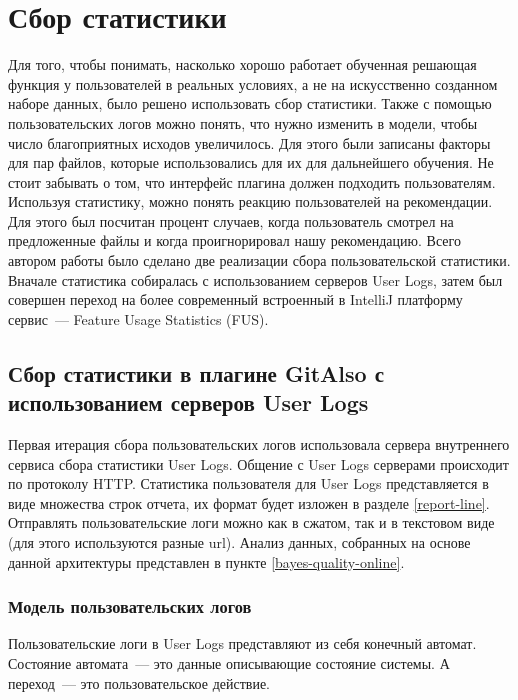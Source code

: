 \section{Сбор статистики}\label{stats-main}
Для того, чтобы понимать, насколько хорошо работает обученная решающая функция у пользователей в реальных условиях, а не на искусственно созданном наборе данных, было решено использовать сбор статистики. Также с помощью пользовательских логов можно понять, что нужно изменить в модели, чтобы число благоприятных исходов увеличилось. Для этого были записаны факторы для пар файлов, которые использовались для их для дальнейшего обучения. Не стоит забывать о том, что интерфейс плагина должен подходить пользователям. Используя статистику, можно понять реакцию пользователей на рекомендации. Для этого был посчитан процент случаев, когда пользователь смотрел на предложенные файлы и когда проигнорировал нашу рекомендацию. Всего автором работы было сделано две реализации сбора пользовательской статистики. Вначале статистика собиралась с использованием серверов User Logs, затем был совершен переход на более современный встроенный в IntelliJ платформу сервис~--- Feature Usage Statistics (FUS).
\subsection{Сбор статистики в плагине GitAlso с использованием серверов User Logs}\label{gitalso-stats}
Первая итерация сбора пользовательских логов использовала сервера внутреннего сервиса сбора статистики User Logs. Общение с User Logs серверами происходит по протоколу HTTP. Статистика пользователя для User Logs представляется в виде множества строк отчета, их формат будет изложен в разделе \ref{report-line}. Отправлять пользовательские логи можно как в сжатом, так и в текстовом виде (для этого используются разные url). Анализ данных, собранных на основе данной архитектуры представлен в пункте \ref{bayes-quality-online}.
\subsubsection{Модель пользовательских логов}
Пользовательские логи в User Logs представляют из себя конечный автомат. Состояние автомата~--- это данные описывающие состояние системы. А переход~--- это пользовательское действие.
